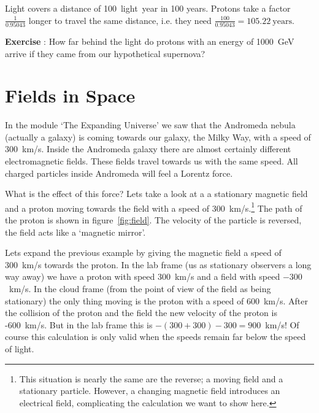 \documentclass[12pt,a4paper]{article}
\numberwithin{equation}{section}
\numberwithin{figure}{section}
\newcounter{Exercise}
\numberwithin{table}{section}
\begin{document}
Light covers a distance of 100~light~year in 100 years. Protons take a factor $\frac{1}{0.95043}$ longer to travel the same distance, i.e. they need $\frac{100}{0.95043}=105.22~\mbox{years}$.

\begin{shaded}
\textbf{Exercise \theExercise {}} : How far behind the light do protons with an energy of 1000~GeV arrive if they came from our hypothetical supernova?\end{shaded}

\section{Fields in Space}
In the module `The Expanding Universe' we saw that the Andromeda nebula (actually a galaxy) is coming towards our galaxy, the Milky Way, with a speed of 300~km/s. Inside the Andromeda galaxy there are almost certainly different electromagnetic fields. These fields travel towards us with the same speed. All charged particles inside Andromeda will feel a Lorentz force.

What is the effect of this force? Lets take a look at a a stationary magnetic field and a proton moving towards the field with a speed of 300~km/s.\footnote{This situation is nearly the same are the reverse; a moving field and a stationary particle. However, a changing magnetic field introduces an electrical field, complicating the calculation we want to show here.} The path of the proton is shown in figure~\ref{fig:field}. The velocity of the particle is reversed, the field acts like a `magnetic mirror'.

Lets expand the previous example by giving the magnetic field a speed of 300~km/s towards the proton. In the lab frame (us as stationary observers a long way away) we have a proton with speed 300~km/s and a field with speed $-300$~km/s. In the cloud frame (from the point of view of the field as being stationary) the only thing moving is the proton with a speed of 600~km/s. After the collision of the proton and the field the new velocity of the proton is -600~km/s. But in the lab frame this is $-(300+300)-300 = 900$~km/s! Of course this calculation is only valid when the speeds remain far below the speed of light.
\end{document}
